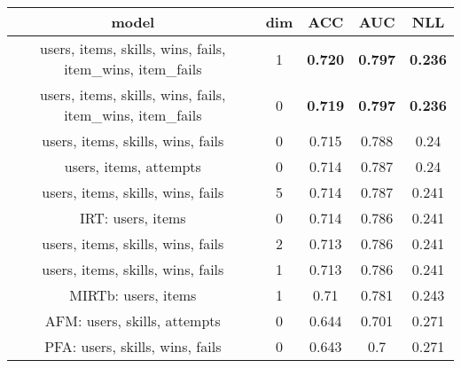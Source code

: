 \begin{tabular}{ccccc}
\toprule
                                  model &  dim &             ACC &             AUC &             NLL \\
\midrule
 users, items, skills, wins, fails, item\_wins, item\_fails &  1 &  \textbf{0.720} &  \textbf{0.797} &  \textbf{0.236} \\
 users, items, skills, wins, fails, item\_wins, item\_fails &  0 &  \textbf{0.719} &  \textbf{0.797} &  \textbf{0.236} \\
 users, items, skills, wins, fails &  0 &  0.715 &  0.788 &  0.24 \\
 users, items, attempts &  0 &  0.714 &  0.787 &  0.24 \\
 users, items, skills, wins, fails &  5 &  0.714 &  0.787 &  0.241 \\
 IRT: users, items &  0 &  0.714 &  0.786 &  0.241 \\
 users, items, skills, wins, fails &  2 &  0.713 &  0.786 &  0.241 \\
 users, items, skills, wins, fails &  1 &  0.713 &  0.786 &  0.241 \\
 MIRTb: users, items &  1 &  0.71 &  0.781 &  0.243 \\
 AFM: users, skills, attempts &  0 &  0.644 &  0.701 &  0.271 \\
 PFA: users, skills, wins, fails &  0 &  0.643 &  0.7 &  0.271 \\
\bottomrule
\end{tabular}
